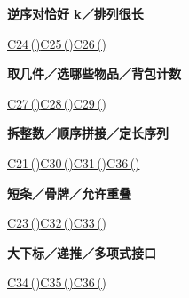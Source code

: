 \documentclass[10pt,a4paper]{article}
\begin{document}
\begin{minipage}{\linewidth}\textbf{逆序对恰好 k／排列很长}\par{\fontsize{9.5}{12}\selectfont \hyperref[C24]{C24\,(\pageref*{C24})}\hspace{.5em}\allowbreak \hyperref[C25]{C25\,(\pageref*{C25})}\hspace{.5em}\allowbreak \hyperref[C26]{C26\,(\pageref*{C26})}}\end{minipage}\par\vspace{5pt}
\begin{minipage}{\linewidth}\textbf{取几件／选哪些物品／背包计数}\par{\fontsize{9.5}{12}\selectfont \hyperref[C27]{C27\,(\pageref*{C27})}\hspace{.5em}\allowbreak \hyperref[C28]{C28\,(\pageref*{C28})}\hspace{.5em}\allowbreak \hyperref[C29]{C29\,(\pageref*{C29})}}\end{minipage}\par\vspace{5pt}
\begin{minipage}{\linewidth}\textbf{拆整数／顺序拼接／定长序列}\par{\fontsize{9.5}{12}\selectfont \hyperref[C21]{C21\,(\pageref*{C21})}\hspace{.5em}\allowbreak \hyperref[C30]{C30\,(\pageref*{C30})}\hspace{.5em}\allowbreak \hyperref[C31]{C31\,(\pageref*{C31})}\hspace{.5em}\allowbreak \hyperref[C36]{C36\,(\pageref*{C36})}}\end{minipage}\par\vspace{5pt}
\begin{minipage}{\linewidth}\textbf{短条／骨牌／允许重叠}\par{\fontsize{9.5}{12}\selectfont \hyperref[C23]{C23\,(\pageref*{C23})}\hspace{.5em}\allowbreak \hyperref[C32]{C32\,(\pageref*{C32})}\hspace{.5em}\allowbreak \hyperref[C33]{C33\,(\pageref*{C33})}}\end{minipage}\par\vspace{5pt}
\begin{minipage}{\linewidth}\textbf{大下标／递推／多项式接口}\par{\fontsize{9.5}{12}\selectfont \hyperref[C34]{C34\,(\pageref*{C34})}\hspace{.5em}\allowbreak \hyperref[C35]{C35\,(\pageref*{C35})}\hspace{.5em}\allowbreak \hyperref[C36]{C36\,(\pageref*{C36})}}\end{minipage}\par\vspace{5pt}
\end{document}

